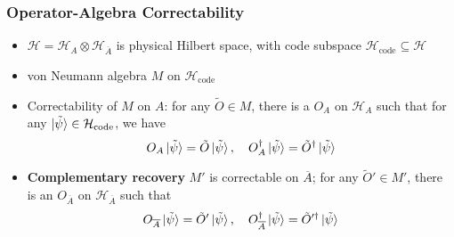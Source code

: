 \documentclass[11pt]{beamer}
\begin{document}
	\begin{frame}
		\frametitle{Operator-Algebra Correctability}
		\begin{itemize}[<+->]
			\item $\mathcal{H}=\mathcal{H}_{A}\otimes \mathcal{H}_{\overline{A}}$ is physical Hilbert space, with code subspace $\mathcal{H}_{\text{code}}\subseteq\mathcal{H}$
			\item von Neumann algebra $M$ on $\mathcal{H}_{\text{code}}$
			\item Correctability of $M$ on $A$:
				for any $\tilde{O}\in M$, there is a $O_{A}$ on $\mathcal{H}_{A}$ such that for any $\ket{\tilde{\psi}}\in\mathcal{H}_{\text{code}}$, we have
				\begin{equation}
					O_{A}\ket{\tilde{\psi}}=\tilde{O}\ket{\tilde{\psi}},\quad O_{A}^{\dagger}\ket{\tilde{\psi}}=\tilde{O}^{\dagger}\ket{\tilde{\psi}}
				\end{equation}
				\item \textbf{Complementary recovery} $M'$ is correctable on $\overline{A}$; for any $\tilde{O}'\in M'$, there is an $O_{\overline{A}}$ on $\mathcal{H}_{\overline{A}}$ such that
			\begin{equation}
				O_{\overline{A}}\ket{\tilde{\psi}}=\tilde{O}'\ket{\tilde{\psi}},\quad O_{\overline{A}}^{\dagger}\ket{\tilde{\psi}}=\tilde{O}'^{\dagger}\ket{\tilde{\psi}}
			\end{equation}
		\end{itemize}
	\end{frame}
\end{document}
